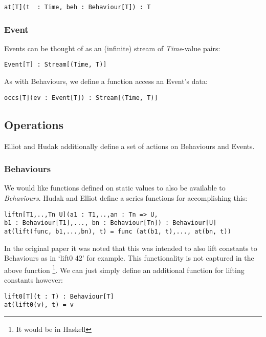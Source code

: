 \begin{verbatim}
at[T](t  : Time, beh : Behaviour[T]) : T
\end{verbatim}
      
      \subsubsection{Event}
        Events can be thought of as an (infinite) stream of \emph{Time}-value pairs:

\begin{verbatim}
Event[T] : Stream[(Time, T)]
\end{verbatim}
        
        As with Behaviours, we define a function access an Event's data:
        
\begin{verbatim}
occs[T](ev : Event[T]) : Stream[(Time, T)]
\end{verbatim}
       
    \subsection{Operations}
      Elliot and Hudak additionally define a set of actions on Behaviours and Events.
      
      \subsubsection{Behaviours}
        We would like functions defined on static values to also be available to \emph{Behaviours}. Hudak
        and Elliot define a series functions for accomplishing this:
        
\begin{verbatim}
liftn[T1,..,Tn U](a1 : T1,..,an : Tn => U, 
b1 : Behaviour[T1],..., bn : Behaviour[Tn]) : Behaviour[U]
at(lift(func, b1,...,bn), t) = func (at(b1, t),..., at(bn, t))
\end{verbatim}

      In the original paper it was noted that this was intended to also lift constants to Behaviours
      as in `lift0 42' for example. This functionality is not captured in the above function \footnote{It would
      be in Haskell}. We can just simply define an additional function for lifting constants however:

\begin{verbatim}
lift0[T](t : T) : Behaviour[T]
at(lift0(v), t) = v
\end{verbatim}
        
